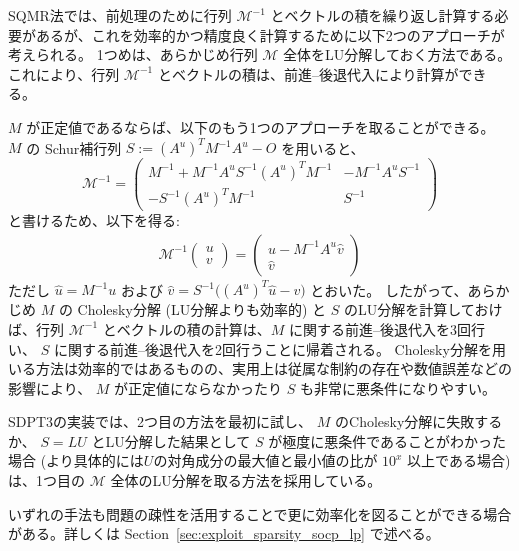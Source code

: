 \documentclass{jsarticle}
\begin{document}
SQMR法では、前処理のために行列 $\mathcal{M}^{-1}$ とベクトルの積を繰り返し計算する必要があるが、これを効率的かつ精度良く計算するために以下2つのアプローチが考えられる。
1つめは、あらかじめ行列 $\mathcal{M}$ 全体をLU分解しておく方法である。これにより、行列 $\mathcal{M}^{-1}$ とベクトルの積は、前進--後退代入により計算ができる。

$M$ が正定値であるならば、以下のもう1つのアプローチを取ることができる。
$M$ の Schur補行列 $S:=(A^u)^T M^{-1} A^u - O$ を用いると、
\[
\mathcal{M}^{-1}=\begin{pmatrix}
    M^{-1} + M^{-1} A^u S^{-1} (A^u)^T M^{-1} & -M^{-1} A^u S^{-1} \\
    -S^{-1} (A^u)^T M^{-1} & S^{-1}
\end{pmatrix}
\]
と書けるため、以下を得る:
\begin{gather*}
    \mathcal{M}^{-1}\begin{pmatrix}u \\ v \end{pmatrix} = \begin{pmatrix} \hat{u} - M^{-1} A^u \hat{v} \\ \hat{v} \end{pmatrix}
\end{gather*}
ただし $\hat{u} = M^{-1} u$ および $\hat{v} = S^{-1}\big((A^u)^T \hat{u} - v \big)$ とおいた。
したがって、あらかじめ $M$ の Cholesky分解 (LU分解よりも効率的) と $S$ のLU分解を計算しておけば、行列 $\mathcal{M}^{-1}$ とベクトルの積の計算は、$M$ に関する前進--後退代入を3回行い、 $S$ に関する前進--後退代入を2回行うことに帰着される。
Cholesky分解を用いる方法は効率的ではあるものの、実用上は従属な制約の存在や数値誤差などの影響により、 $M$ が正定値にならなかったり $S$ も非常に悪条件になりやすい。

SDPT3の実装では、2つ目の方法を最初に試し、 $M$ のCholesky分解に失敗するか、 $S=LU$ とLU分解した結果として $S$ が極度に悪条件であることがわかった場合 (より具体的には$U$の対角成分の最大値と最小値の比が $10^{x}$ 以上である場合)は、1つ目の $\mathcal{M}$ 全体のLU分解を取る方法を採用している。

いずれの手法も問題の疎性を活用することで更に効率化を図ることができる場合がある。詳しくは Section~\ref{sec:exploit_sparsity_socp_lp} で述べる。
\end{document}
